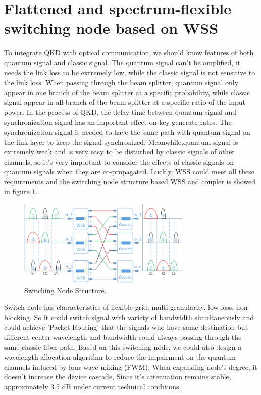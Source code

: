 \documentclass[letterpaper,10pt]{article}
\begin{document}
\section{Flattened and spectrum-flexible switching node based on WSS}

To integrate QKD with optical communication, we should know features of both quantum signal and classic signal. The quantum signal can't be amplified, it needs the link loss to be extremely low, while the classic signal is not sensitive to the link loss. When passing through the beam splitter, quantum signal only appear in one branch of the beam splitter at a specific probability, while classic signal appear in all branch of the beam splitter at a specific ratio of the input power. In the process of QKD, the delay time between quantum signal and synchronization signal has an important effect on key generate rates. The synchronization signal is needed to have the same path with quantum signal on the link layer to keep the signal synchronized. Meanwhile,quantum signal is extremely weak and is very easy to be disturbed by classic signals of other channels, so it's very important to consider the effects of classic signals on quantum signals when they are co-propagated. Luckly, WSS could meet all these requirements and the switching node structure based WSS and coupler is showed in figure \ref{Fig:switching_node_structure}.

\begin{figure}[htbp]
  \centering
  \includegraphics[width=8.3cm]{swtiching_node_struct}
  \caption{Switching Node Structure.} \label{Fig:switching_node_structure}
\end{figure}
Switch node has characteristics of flexible grid, multi-granularity, low loss, non-blocking. So it could switch signal with variety of bandwidth simultaneously and could achieve 'Packet Routing' that the signals who have same destination but different center wavelength and bandwidth could always passing through the same classic fiber path. Based on this switching node, we could also design a wavelength allocation algorithm to reduce the impairment on the quantum channels induced by four-wave mixing (FWM). When expanding node's degree, it doesn't increase the device cascade, Since it's attenuation remains stable, approximately 3.5 dB under current technical conditions. 
\end{document}
